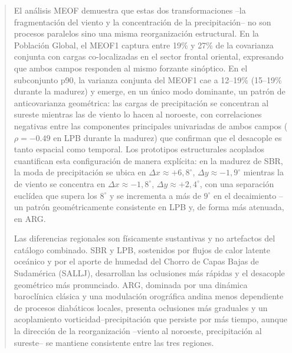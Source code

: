 \begin{abstract}
El análisis MEOF demuestra que estas dos transformaciones --la fragmentación del viento y la concentración de la precipitación-- no son procesos paralelos sino una misma reorganización estructural. En la Población Global, el MEOF1 captura entre 19\% y 27\% de la covarianza conjunta con cargas co-localizadas en el sector frontal oriental, expresando que ambos campos responden al mismo forzante sinóptico. En el subconjunto p90, la varianza conjunta del MEOF1 cae a 12--19\% (15--19\% durante la madurez) y emerge, en un único modo dominante, un patrón de anticovarianza geométrica: las cargas de precipitación se concentran al sureste mientras las de viento lo hacen al noroeste, con correlaciones negativas entre las componentes principales univariadas de ambos campos ($\rho = -0.49$ en LPB durante la madurez) que confirman que el desacople es tanto espacial como temporal. Los prototipos estructurales acoplados cuantifican esta configuración de manera explícita: en la madurez de SBR, la moda de precipitación se ubica en $\Delta x \approx +6{,}8^{\circ}$, $\Delta y \approx -1{,}9^{\circ}$ mientras la de viento se concentra en $\Delta x \approx -1{,}8^{\circ}$, $\Delta y \approx +2{,}4^{\circ}$, con una separación euclídea que supera los $8^{\circ}$ y se incrementa a más de $9^{\circ}$ en el decaimiento --un patrón geométricamente consistente en LPB y, de forma más atenuada, en ARG.

Las diferencias regionales son físicamente sustantivas y no artefactos del catálogo combinado. SBR y LPB, sostenidos por flujos de calor latente oceánico y por el aporte de humedad del Chorro de Capas Bajas de Sudamérica (SALLJ), desarrollan las oclusiones más rápidas y el desacople geométrico más pronunciado. ARG, dominada por una dinámica baroclínica clásica y una modulación orográfica andina menos dependiente de procesos diabáticos locales, presenta oclusiones más graduales y un acoplamiento vorticidad--precipitación que persiste por más tiempo, aunque la dirección de la reorganización --viento al noroeste, precipitación al sureste-- se mantiene consistente entre las tres regiones.


\end{abstract}
